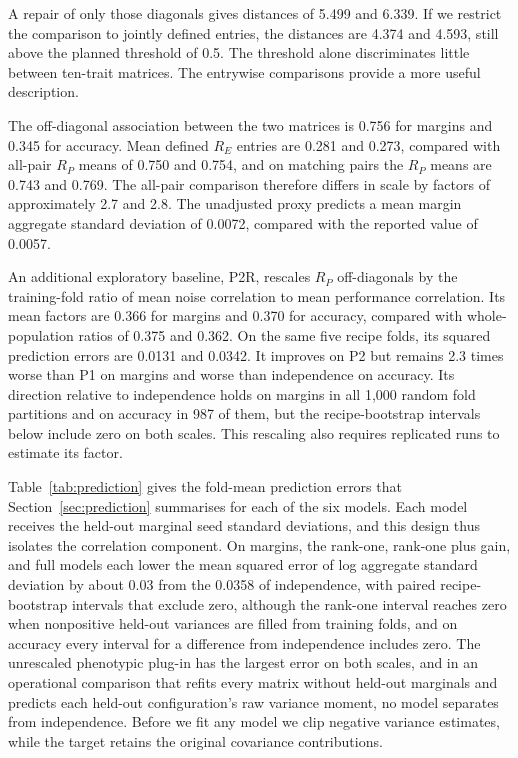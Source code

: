 A repair of only those diagonals gives distances of 5.499 and 6.339. If we restrict the comparison to jointly defined entries, the distances are 4.374 and 4.593, still above the planned threshold of 0.5. The threshold alone discriminates little between ten-trait matrices. The entrywise comparisons provide a more useful description.

The off-diagonal association between the two matrices is 0.756 for margins and 0.345 for accuracy. Mean defined $R_E$ entries are 0.281 and 0.273, compared with all-pair $R_P$ means of 0.750 and 0.754, and on matching pairs the $R_P$ means are 0.743 and 0.769. The all-pair comparison therefore differs in scale by factors of approximately 2.7 and 2.8. The unadjusted proxy predicts a mean margin aggregate standard deviation of 0.0072, compared with the reported value of 0.0057.

An additional exploratory baseline, P2R, rescales $R_P$ off-diagonals by the training-fold ratio of mean noise correlation to mean performance correlation. Its mean factors are 0.366 for margins and 0.370 for accuracy, compared with whole-population ratios of 0.375 and 0.362. On the same five recipe folds, its squared prediction errors are 0.0131 and 0.0342. It improves on P2 but remains 2.3 times worse than P1 on margins and worse than independence on accuracy. Its direction relative to independence holds on margins in all 1,000 random fold partitions and on accuracy in 987 of them, but the recipe-bootstrap intervals below include zero on both scales. This rescaling also requires replicated runs to estimate its factor.

\label{app:paired}
Table~\ref{tab:prediction} gives the fold-mean prediction errors that Section~\ref{sec:prediction} summarises for each of the six models. Each model receives the held-out marginal seed standard deviations, and this design thus isolates the correlation component. On margins, the rank-one, rank-one plus gain, and full models each lower the mean squared error of log aggregate standard deviation by about 0.03 from the 0.0358 of independence, with paired recipe-bootstrap intervals that exclude zero, although the rank-one interval reaches zero when nonpositive held-out variances are filled from training folds, and on accuracy every interval for a difference from independence includes zero. The unrescaled phenotypic plug-in has the largest error on both scales, and in an operational comparison that refits every matrix without held-out marginals and predicts each held-out configuration's raw variance moment, no model separates from independence. Before we fit any model we clip negative variance estimates, while the target retains the original covariance contributions.

